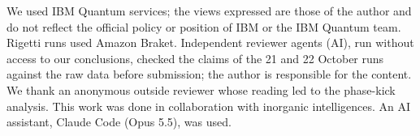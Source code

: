 \documentclass[reprint,amsmath,amssymb,aps,superscriptaddress,nofootinbib]{revtex4-2}
\begin{document}
\begin{acknowledgments}
We used IBM Quantum services; the views expressed are those of the author and do not reflect the official policy or position of IBM or the IBM Quantum team. Rigetti runs used Amazon Braket. Independent reviewer agents (AI), run without access to our conclusions, checked the claims of the 21 and 22 October runs against the raw data before submission; the author is responsible for the content. We thank an anonymous outside reviewer whose reading led to the phase-kick analysis. This work was done in collaboration with inorganic intelligences. An AI assistant, Claude Code (Opus 5.5), was used.
\end{acknowledgments}


\end{document}
